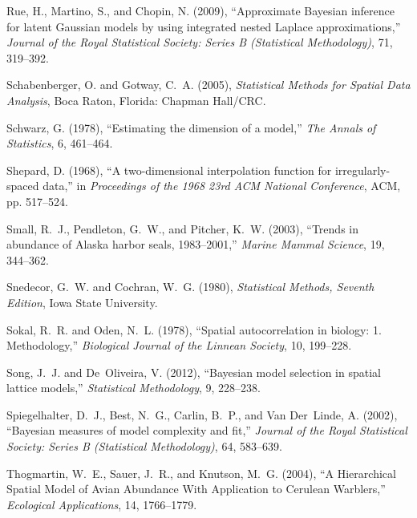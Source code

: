 \documentclass[11pt, titlepage]{article}\usepackage[]{graphicx}\usepackage[]{color}
\begin{document}
\begin{spacing}{1.9}
\begin{flushleft}
\begin{thebibliography}{126}
Rue, H., Martino, S., and Chopin, N. (2009), \enquote{Approximate Bayesian
  inference for latent Gaussian models by using integrated nested Laplace
  approximations,} \textit{Journal of the Royal Statistical Society: Series B
  (Statistical Methodology)}, 71, 319--392.

Schabenberger, O. and Gotway, C.~A. (2005), \textit{Statistical Methods for
  Spatial Data Analysis}, Boca Raton, Florida: Chapman Hall/CRC.

Schwarz, G. (1978), \enquote{Estimating the dimension of a model,} \textit{The
  Annals of Statistics}, 6, 461--464.

Shepard, D. (1968), \enquote{A two-dimensional interpolation function for
  irregularly-spaced data,} in \textit{Proceedings of the 1968 23rd ACM
  National Conference}, ACM, pp. 517--524.

Small, R.~J., Pendleton, G.~W., and Pitcher, K.~W. (2003), \enquote{Trends in
  abundance of {A}laska harbor seals, 1983--2001,} \textit{Marine Mammal
  Science}, 19, 344--362.

Snedecor, G.~W. and Cochran, W.~G. (1980), \textit{Statistical Methods,
  {S}eventh Edition}, Iowa State University.

Sokal, R.~R. and Oden, N.~L. (1978), \enquote{Spatial autocorrelation in
  biology: 1. Methodology,} \textit{Biological Journal of the Linnean Society},
  10, 199--228.

Song, J.~J. and De~Oliveira, V. (2012), \enquote{Bayesian model selection in
  spatial lattice models,} \textit{Statistical Methodology}, 9, 228--238.

Spiegelhalter, D.~J., Best, N.~G., Carlin, B.~P., and Van Der~Linde, A. (2002),
  \enquote{Bayesian measures of model complexity and fit,} \textit{Journal of
  the Royal Statistical Society: Series B (Statistical Methodology)}, 64,
  583--639.

Thogmartin, W.~E., Sauer, J.~R., and Knutson, M.~G. (2004), \enquote{A
  Hierarchical Spatial Model of Avian Abundance With Application to Cerulean
  Warblers,} \textit{Ecological Applications}, 14, 1766--1779.


\end{thebibliography}
\end{flushleft}
\end{spacing}
\end{document}
